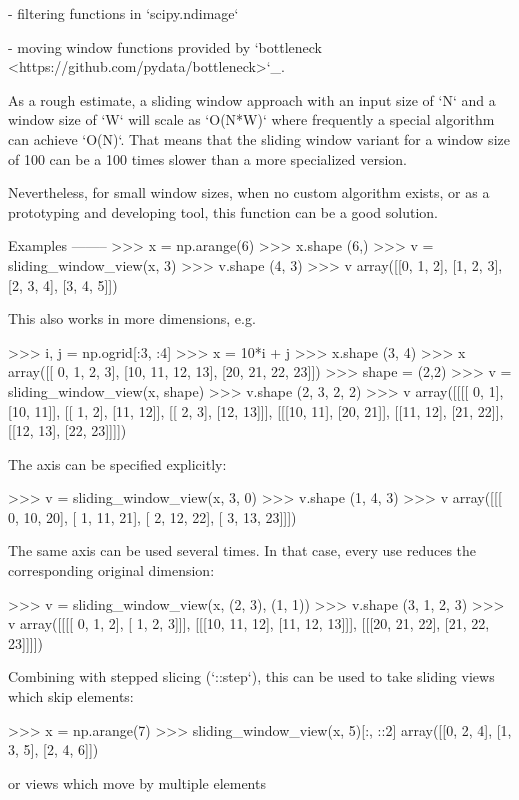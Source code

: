 \begin{DoxyVerb}
- filtering functions in `scipy.ndimage`

- moving window functions provided by
  `bottleneck <https://github.com/pydata/bottleneck>`_.

As a rough estimate, a sliding window approach with an input size of `N`
and a window size of `W` will scale as `O(N*W)` where frequently a special
algorithm can achieve `O(N)`. That means that the sliding window variant
for a window size of 100 can be a 100 times slower than a more specialized
version.

Nevertheless, for small window sizes, when no custom algorithm exists, or
as a prototyping and developing tool, this function can be a good solution.

Examples
--------
>>> x = np.arange(6)
>>> x.shape
(6,)
>>> v = sliding_window_view(x, 3)
>>> v.shape
(4, 3)
>>> v
array([[0, 1, 2],
       [1, 2, 3],
       [2, 3, 4],
       [3, 4, 5]])

This also works in more dimensions, e.g.

>>> i, j = np.ogrid[:3, :4]
>>> x = 10*i + j
>>> x.shape
(3, 4)
>>> x
array([[ 0,  1,  2,  3],
       [10, 11, 12, 13],
       [20, 21, 22, 23]])
>>> shape = (2,2)
>>> v = sliding_window_view(x, shape)
>>> v.shape
(2, 3, 2, 2)
>>> v
array([[[[ 0,  1],
         [10, 11]],
        [[ 1,  2],
         [11, 12]],
        [[ 2,  3],
         [12, 13]]],
       [[[10, 11],
         [20, 21]],
        [[11, 12],
         [21, 22]],
        [[12, 13],
         [22, 23]]]])

The axis can be specified explicitly:

>>> v = sliding_window_view(x, 3, 0)
>>> v.shape
(1, 4, 3)
>>> v
array([[[ 0, 10, 20],
        [ 1, 11, 21],
        [ 2, 12, 22],
        [ 3, 13, 23]]])

The same axis can be used several times. In that case, every use reduces
the corresponding original dimension:

>>> v = sliding_window_view(x, (2, 3), (1, 1))
>>> v.shape
(3, 1, 2, 3)
>>> v
array([[[[ 0,  1,  2],
         [ 1,  2,  3]]],
       [[[10, 11, 12],
         [11, 12, 13]]],
       [[[20, 21, 22],
         [21, 22, 23]]]])

Combining with stepped slicing (`::step`), this can be used to take sliding
views which skip elements:

>>> x = np.arange(7)
>>> sliding_window_view(x, 5)[:, ::2]
array([[0, 2, 4],
       [1, 3, 5],
       [2, 4, 6]])

or views which move by multiple elements


\end{DoxyVerb}
